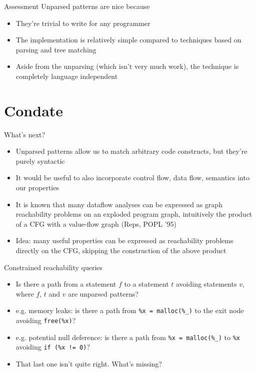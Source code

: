 \documentclass{beamer}
\begin{document}
\begin{frame}{Assessment}
Unparsed patterns are nice because
\begin{itemize}
\item They're trivial to write for any programmer
\item The implementation is relatively simple compared to techniques
based on parsing and tree matching
\item Aside from the unparsing (which isn't very much work), the technique
is completely language independent
\end{itemize}
\end{frame}

\section{Condate}
\begin{frame}{What's next?}
\begin{itemize}
\item Unparsed patterns allow us to match arbitrary code constructs, but
they're purely syntactic
\item It would be useful to also incorporate control flow, data flow, 
semantics into our properties
\item It is known that many dataflow analyses can be expressed as graph
reachability problems on an exploded program graph, intuitively the product
of a CFG with a value-flow graph (Reps, POPL '95)
\item Idea: many useful properties can be expressed as reachability problems
directly on the CFG, skipping the construction of the above product
\end{itemize}
\end{frame}

\begin{frame}{Constrained reachability queries}
\begin{itemize}
\item Is there a path from a statement $f$ to a statement $t$ avoiding
statements $v$, where $f$, $t$ and $v$ are unparsed patterns?
\item e.g. memory leaks: is there a path from {\tt \%x = malloc(\%\_)} to
the exit node avoiding {\tt free(\%x)}?
\pause
\item e.g. potential null deference: is there a path from {\tt \%x = malloc(\%\_)}
to {\tt *\%x} avoiding {\tt if (\%x != 0)}?
\pause
\item That last one isn't quite right. What's missing?
\end{itemize}
\end{frame}
\end{document}
